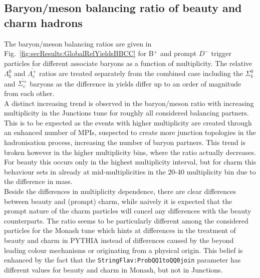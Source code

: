 \subsection{Baryon/meson balancing ratio of beauty and charm hadrons}
\label{sec:results:b/mBalancing}
The baryon/meson balancing ratios are given in Fig.~\ref{fig:secResults:GlobalRelYieldsBBCC} for B$^{+}$ and prompt $D^{-}$ trigger particles for different associate baryons as a function of multiplicity. The relative $\Lambda_{b}^{0}$ and $\overline{\Lambda_{c}^{+}}$ ratios are treated separately from the combined case including the $\Sigma_{b}^{0}$ and $\overline{\Sigma^{+}_{c}}$ baryons as the difference in yields differ up to an order of magnitude from each other. \\
\indent A distinct increasing trend is observed in the baryon/meson ratio with increasing multiplicity in the Junctions tune for roughly all considered balancing partners. This is to be expected as the events with higher multiplicity are created through an enhanced number of MPIs, suspected to create more junction topologies in the hadronisation process, increasing the number of baryon partners. This trend is broken however in the higher multiplicity bins, where the ratio actually decreases. For beauty this occurs only in the highest multiplicity interval, but for charm this behaviour sets in already at mid-multiplicities in the 20-40 multiplicity bin due to the difference in mass. \\
\indent Beside the differences in multiplicity dependence, there are clear differences between beauty and (prompt) charm, while naively it is expected that the prompt nature of the charm particles will cancel any differences with the beauty counterparts. The ratio seems to be particularly different among the considered particles for the Monash tune which hints at differences in the treatment of beauty and charm in PYTHIA instead of differences caused by the beyond leading colour mechanisms or originating from a physical origin. This belief is enhanced by the fact that the \texttt{StringFlav:ProbQQ1toQQ0join} parameter has different values for beauty and charm in Monash, but not in Junctions.
%
